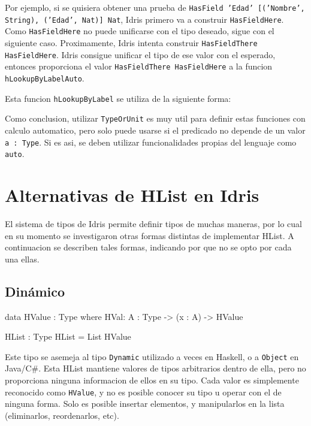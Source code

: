 Por ejemplo, si se quisiera obtener una prueba de \texttt{HasField 'Edad' [('Nombre', String), ('Edad', Nat)] Nat}, Idris primero va a construir \texttt{HasFieldHere}. Como \texttt{HasFieldHere} no puede unificarse con el tipo deseado, sigue con el siguiente caso. Proximamente, Idris intenta construir \texttt{HasFieldThere HasFieldHere}. Idris consigue unificar el tipo de ese valor con el esperado, entonces proporciona el valor \texttt{HasFieldThere HasFieldHere} a la funcion \texttt{hLookupByLabelAuto}.

Esta funcion \texttt{hLookupByLabel} se utiliza de la siguiente forma:




Como conclusion, utilizar \texttt{TypeOrUnit} es muy util para definir estas funciones con calculo automatico, pero solo puede usarse si el predicado no depende de un valor \texttt{a : Type}. Si es asi, se deben utilizar funcionalidades propias del lenguaje como \texttt{auto}.

\section{Alternativas de HList en Idris}

El sistema de tipos de Idris permite definir tipos de muchas maneras, por lo cual en su momento se investigaron otras formas distintas de implementar HList.
A continuacion se describen tales formas, indicando por que no se opto por cada una ellas.

\subsection{Dinámico}

\begin{code}
data HValue : Type where
    HVal: {A : Type} -> (x : A) -> HValue

HList : Type
HList = List HValue 
\end{code}

Este tipo se asemeja al tipo \texttt{Dynamic} utilizado a veces en Haskell, o a \texttt{Object} en Java/C\#. Esta HList mantiene valores de tipos arbitrarios dentro de ella, pero no proporciona ninguna informacion de ellos en su tipo. Cada valor es simplemente reconocido como \texttt{HValue}, y no es posible conocer su tipo u operar con el de ninguna forma. Solo es posible insertar elementos, y manipularlos en la lista (eliminarlos, reordenarlos, etc).

